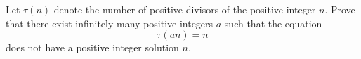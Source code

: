 Let $\tau(n)$ denote the number of positive divisors of the positive integer $n$. Prove that there exist infinitely many positive integers $a$ such that the equation
\[
\tau(an) = n
\]
does not have a positive integer solution $n$.
